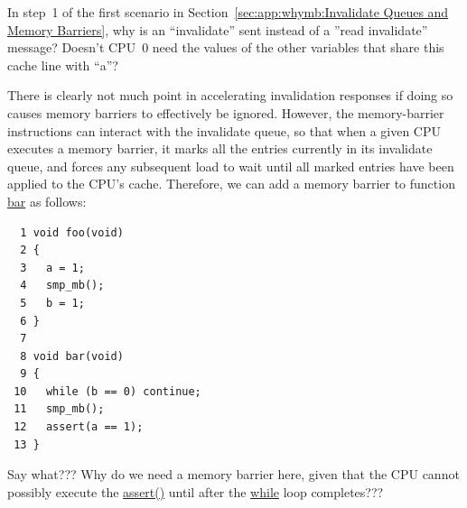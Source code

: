 \QuickQuiz{}
	In step~1 of the first scenario in
	Section~\ref{sec:app:whymb:Invalidate Queues and Memory Barriers},
	why is an ``invalidate'' sent instead of a ''read invalidate''
	message?
	Doesn't CPU~0 need the values of the other variables that share
	this cache line with ``a''?
 \QuickQuizEnd

There is clearly not much point in accelerating invalidation responses
if doing so causes memory barriers to effectively be ignored.
However, the memory-barrier instructions can interact with
the invalidate queue, so that when a given CPU executes a memory
barrier, it marks all the entries currently in its invalidate queue,
and forces any subsequent load to wait until all marked entries
have been applied to the CPU's cache.
Therefore, we can add a memory barrier to function \url{bar} as follows:

\vspace{5pt}
\begin{minipage}[t]{\columnwidth}
\small
\begin{verbatim}
  1 void foo(void)
  2 {
  3   a = 1;
  4   smp_mb();
  5   b = 1;
  6 }
  7
  8 void bar(void)
  9 {
 10   while (b == 0) continue;
 11   smp_mb();
 12   assert(a == 1);
 13 }
\end{verbatim}
\end{minipage}
\vspace{5pt}

\QuickQuiz{}
	Say what???
	Why do we need a memory barrier here, given that the CPU cannot
	possibly execute the \url{assert()} until after the
	\url{while} loop completes???
 \QuickQuizEnd

